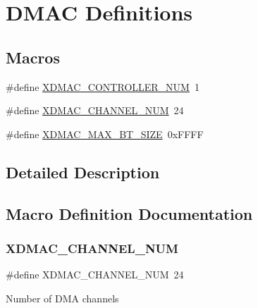\hypertarget{group__dmac__defines}{}\section{D\+M\+AC Definitions}
\label{group__dmac__defines}
\subsection*{Macros}
\begin{DoxyCompactItemize}
\item 
\#define \mbox{\hyperlink{group__dmac__defines_gae5d5575bb591d265478fefce47be47fe}{X\+D\+M\+A\+C\+\_\+\+C\+O\+N\+T\+R\+O\+L\+L\+E\+R\+\_\+\+N\+UM}}~1
\item 
\#define \mbox{\hyperlink{group__dmac__defines_ga187b9a379b187ec593454b0541118e68}{X\+D\+M\+A\+C\+\_\+\+C\+H\+A\+N\+N\+E\+L\+\_\+\+N\+UM}}~24
\item 
\#define \mbox{\hyperlink{group__dmac__defines_ga42d9b2bdc734cf44877efb186dc33790}{X\+D\+M\+A\+C\+\_\+\+M\+A\+X\+\_\+\+B\+T\+\_\+\+S\+I\+ZE}}~0x\+F\+F\+FF
\end{DoxyCompactItemize}


\subsection{Detailed Description}


\subsection{Macro Definition Documentation}
\mbox{\label{group__dmac__defines_ga187b9a379b187ec593454b0541118e68}} 
\subsubsection{\texorpdfstring{XDMAC\_CHANNEL\_NUM}{XDMAC\_CHANNEL\_NUM}}
{\footnotesize\ttfamily \#define X\+D\+M\+A\+C\+\_\+\+C\+H\+A\+N\+N\+E\+L\+\_\+\+N\+UM~24}

Number of D\+MA channels \mbox{\label{group__dmac__defines_gae5d5575bb591d265478fefce47be47fe}} 
